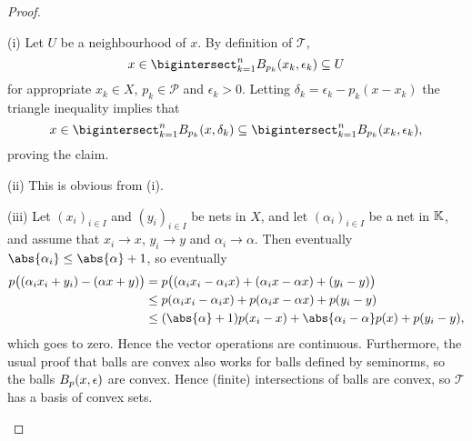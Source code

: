 \documentclass[article, a4paper, 11pt, oneside]{memoir}
\numberwithin{equation}{chapter}
\newcommand{\calT}{\mathcal{T}}
\newcommand{\calP}{\mathcal{P}}
\begin{document}
\begin{proof}
\begin{proofsec}
    \item[(i)]
    Let $U$ be a neighbourhood of $x$. By definition of $\calT$,
    \begin{equation*}
        x
            \in \bigintersect_{k=1}^n \ball[p_k]{x_k}{\epsilon_k}
            \subseteq U
    \end{equation*}
    for appropriate $x_k \in X$, $p_k \in \calP$ and $\epsilon_k > 0$. Letting $\delta_k = \epsilon_k - p_k(x - x_k)$ the triangle inequality implies that
    \begin{equation*}
        x
            \in \bigintersect_{k=1}^n \ball[p_k]{x}{\delta_k}
            \subseteq \bigintersect_{k=1}^n \ball[p_k]{x_k}{\epsilon_k},
    \end{equation*}
    proving the claim.

    \item[(ii)]
    This is obvious from (i).

    \item[(iii)]
    Let $(x_i)_{i \in I}$ and $(y_i)_{i \in I}$ be nets in $X$, and let $(\alpha_i)_{i \in I}$ be a net in $\field$, and assume that $x_i \to x$, $y_i \to y$ and $\alpha_i \to \alpha$. Then eventually $\abs{\alpha_i} \leq \abs{\alpha} + 1$, so eventually
    \begin{align*}
        p\bigl( (\alpha_i x_i + y_i) - (\alpha x + y) \bigr)
            &= p\bigl( (\alpha_i x_i - \alpha_i x) + (\alpha_i x - \alpha x) + (y_i - y) \bigr) \\
            &\leq p(\alpha_i x_i - \alpha_i x) + p(\alpha_i x - \alpha x) + p(y_i - y) \\
            &\leq (\abs{\alpha} + 1) p(x_i - x) + \abs{\alpha_i - \alpha} p(x) + p(y_i - y),
    \end{align*}
    which goes to zero. Hence the vector operations are continuous. Furthermore, the usual proof that balls are convex also works for balls defined by seminorms, so the balls $\ball[p]{x}{\epsilon}$ are convex. Hence (finite) intersections of balls are convex, so $\calT$ has a basis of convex sets.
\end{proofsec}
\end{proof}
\end{document}
